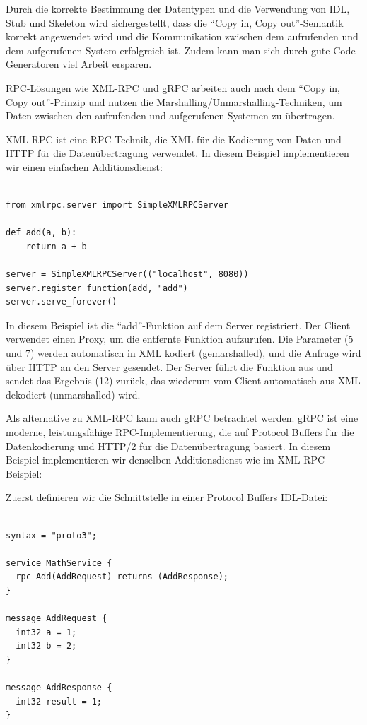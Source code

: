 \documentclass[../vs-script-first-v01.tex]{subfiles}
\begin{document}
Durch die korrekte Bestimmung der Datentypen und die Verwendung von IDL, Stub und Skeleton wird sichergestellt, dass die \enquote{Copy in, Copy out}-Semantik korrekt angewendet wird und die Kommunikation zwischen dem aufrufenden und dem aufgerufenen System erfolgreich ist. Zudem kann man sich durch gute Code Generatoren viel Arbeit ersparen. 

RPC-Lösungen wie XML-RPC und gRPC arbeiten auch nach dem \enquote{Copy in, Copy out}-Prinzip und nutzen die Marshalling/Unmarshalling-Techniken, um Daten zwischen den aufrufenden und aufgerufenen Systemen zu übertragen. 

XML-RPC ist eine RPC-Technik, die XML für die Kodierung von Daten und HTTP für die Datenübertragung verwendet. In diesem Beispiel implementieren wir einen einfachen Additionsdienst:\\\\

\noindent\begin{minipage}{\textwidth}
\begin{lstlisting}[caption={XML-RPC in Python},captionpos=b,label={lst:xmp-rpc-python}]
from xmlrpc.server import SimpleXMLRPCServer

def add(a, b):
    return a + b

server = SimpleXMLRPCServer(("localhost", 8080))
server.register_function(add, "add")
server.serve_forever()
\end{lstlisting}
\end{minipage}

In diesem Beispiel ist die \enquote{add}-Funktion auf dem Server registriert. Der Client verwendet einen Proxy, um die entfernte Funktion aufzurufen. Die Parameter (5 und 7) werden automatisch in XML kodiert (gemarshalled), und die Anfrage wird über HTTP an den Server gesendet. Der Server führt die Funktion aus und sendet das Ergebnis (12) zurück, das wiederum vom Client automatisch aus XML dekodiert (unmarshalled) wird.

Als alternative zu XML-RPC kann auch gRPC betrachtet werden. gRPC ist eine moderne, leistungsfähige RPC-Implementierung, die auf Protocol Buffers für die Datenkodierung und HTTP/2 für die Datenübertragung basiert. In diesem Beispiel implementieren wir denselben Additionsdienst wie im XML-RPC-Beispiel:

Zuerst definieren wir die Schnittstelle in einer Protocol Buffers IDL-Datei: \\\\

\noindent\begin{minipage}{\textwidth}
\begin{lstlisting}[caption={gRPC IDL},captionpos=b,label={lst:grpc-idl}]
syntax = "proto3";

service MathService {
  rpc Add(AddRequest) returns (AddResponse);
}

message AddRequest {
  int32 a = 1;
  int32 b = 2;
}

message AddResponse {
  int32 result = 1;
}
\end{lstlisting}
\end{minipage}
\end{document}
